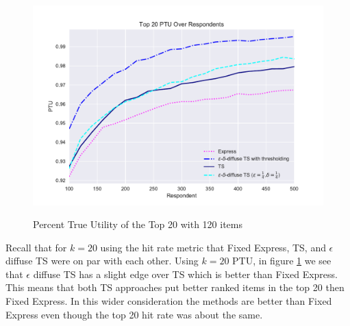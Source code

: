 \documentclass[a4paper,12pt]{article}
\begin{document}
\begin{figure}
\caption{Percent True Utility of the Top 20 with 120 items}
\includegraphics[width=1\textwidth]{plots/PTU120v20k20.pdf}
\label{fig:20util}
\end{figure}
Recall that for $k=20$ using the hit rate metric that Fixed Express, TS, and $\epsilon$ diffuse TS were on par with each other.
Using $k=20$ PTU, in figure \ref{fig:20util} we see that $\epsilon$ diffuse TS has a slight edge over TS which is better than Fixed Express. This means that both TS approaches put better ranked items in the top 20 then Fixed Express. In this wider consideration the methods are better than Fixed Express even though the top 20 hit rate was about the same.
\end{document}
